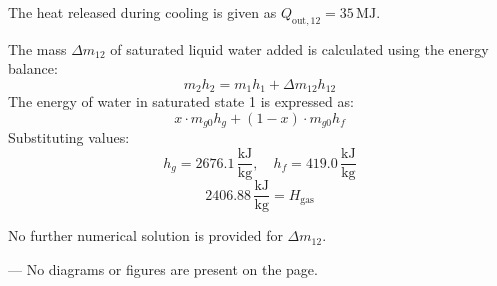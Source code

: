 The heat released during cooling is given as \( Q_{\text{out},12} = 35 \, \text{MJ} \).  

The mass \( \Delta m_{12} \) of saturated liquid water added is calculated using the energy balance:  
\[
m_2 h_2 = m_1 h_1 + \Delta m_{12} h_{12}
\]  
The energy of water in saturated state 1 is expressed as:  
\[
x \cdot m_{g0} h_g + (1-x) \cdot m_{g0} h_f
\]  
Substituting values:  
\[
h_g = 2676.1 \, \frac{\text{kJ}}{\text{kg}}, \quad h_f = 419.0 \, \frac{\text{kJ}}{\text{kg}}
\]  
\[
2406.88 \, \frac{\text{kJ}}{\text{kg}} = H_{\text{gas}}
\]  

No further numerical solution is provided for \( \Delta m_{12} \).  

---  
No diagrams or figures are present on the page.